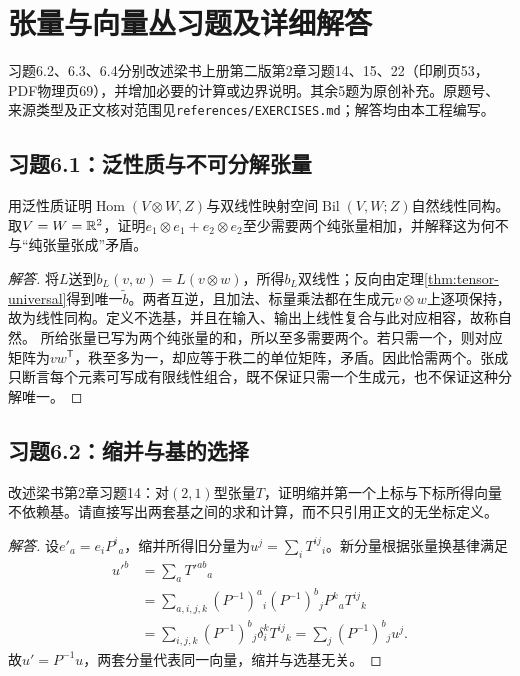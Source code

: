 \section{张量与向量丛习题及详细解答}
习题6.2、6.3、6.4分别改述梁书上册第二版第2章习题14、15、22（印刷页53，PDF物理页69），并增加必要的计算或边界说明。其余5题为原创补充。原题号、来源类型及正文核对范围见\texttt{references/EXERCISES.md}；解答均由本工程编写。

\subsection*{习题6.1：泛性质与不可分解张量}
用泛性质证明$\operatorname{Hom}(V\otimes W,Z)$与双线性映射空间$\operatorname{Bil}(V,W;Z)$自然线性同构。取$V=W=\mathbb{R}^2$，证明$e_1\otimes e_1+e_2\otimes e_2$至少需要两个纯张量相加，并解释这为何不与“纯张量张成”矛盾。
\begin{proof}[解答]
将$L$送到$b_L(v,w)=L(v\otimes w)$，所得$b_L$双线性；反向由定理\ref{thm:tensor-universal}得到唯一$\widetilde b$。两者互逆，且加法、标量乘法都在生成元$v\otimes w$上逐项保持，故为线性同构。定义不选基，并且在输入、输出上线性复合与此对应相容，故称自然。
所给张量已写为两个纯张量的和，所以至多需要两个。若只需一个，则对应矩阵为$vw^{\mathsf T}$，秩至多为一，却应等于秩二的单位矩阵，矛盾。因此恰需两个。张成只断言每个元素可写成有限线性组合，既不保证只需一个生成元，也不保证这种分解唯一。
\end{proof}

\subsection*{习题6.2：缩并与基的选择}
改述梁书第2章习题14：对$(2,1)$型张量$T$，证明缩并第一个上标与下标所得向量不依赖基。请直接写出两套基之间的求和计算，而不只引用正文的无坐标定义。
\begin{proof}[解答]
设$e'_a=e_iP^i{}_a$，缩并所得旧分量为$u^j=\sum_iT^{ij}{}_i$。新分量根据张量换基律满足
\begin{align*}
 u'^b&=\sum_aT'^{ab}{}_a\\
 &=\sum_{a,i,j,k}(P^{-1})^a{}_i(P^{-1})^b{}_jP^k{}_a T^{ij}{}_k\\
 &=\sum_{i,j,k}(P^{-1})^b{}_j\delta^k_iT^{ij}{}_k
 =\sum_j(P^{-1})^b{}_j u^j.
\end{align*}
故$u'=P^{-1}u$，两套分量代表同一向量，缩并与选基无关。
\end{proof}

